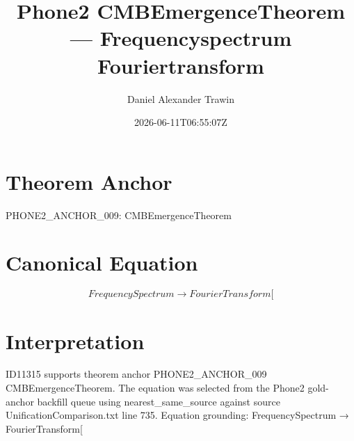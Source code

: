 \documentclass[11pt]{article}
\title{Phone2 CMBEmergenceTheorem — Frequencyspectrum Fouriertransform}
\author{Daniel Alexander Trawin}
\date{2026-06-11T06:55:07Z}
\begin{document}
\maketitle
\section*{Theorem Anchor}
PHONE2_ANCHOR_009: CMBEmergenceTheorem
\section*{Canonical Equation}
\[
FrequencySpectrum → FourierTransform[
\]
\section*{Interpretation}
ID11315 supports theorem anchor PHONE2_ANCHOR_009 CMBEmergenceTheorem. The equation was selected from the Phone2 gold-anchor backfill queue using nearest_same_source against source UnificationComparison.txt line 735. Equation grounding: FrequencySpectrum → FourierTransform[
\end{document}
